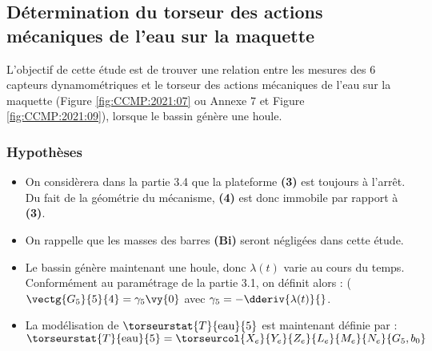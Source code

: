 \ifprof
\begin{corrige}
\end{corrige}
\else
\fi

\ifprof
\begin{corrige}
\end{corrige}
\else
\fi

\subsection{Détermination du torseur des actions mécaniques de l’eau sur la maquette}

\begin{obj}L’objectif de cette étude est de trouver une relation entre les mesures des 6 capteurs dynamométriques et le torseur des actions mécaniques de l’eau sur la maquette (Figure \ref{fig:CCMP:2021:07} ou Annexe 7 et Figure \ref{fig:CCMP:2021:09}), lorsque le bassin génère une houle.
\end{obj}


\subsubsection*{Hypothèses}
\begin{itemize}
    \item On considèrera dans la partie 3.4 que la plateforme \textbf{(3)} est toujours à l’arrêt. Du fait de la géométrie du mécanisme, \textbf{(4)} est donc immobile par rapport à \textbf{(3)}.
    \item On rappelle que les masses des barres \textbf{(Bi)} seront négligées dans cette étude.
    \item Le bassin génère maintenant une houle, donc $\lambda(t)$ varie au cours du temps. Conformément au paramétrage de la partie 3.1, on définit alors : ($\vectg{G_5}{5}{4}=\gamma_5 \vy{0}$ avec $\gamma_5=- \dderiv{\lambda(t)}{}$.
    \item La modélisation de $\torseurstat{T}{\text{eau}}{5}$ est maintenant définie par :
    $\torseurstat{T}{\text{eau}}{5} =  \torseurcol{X_e}{Y_e}{Z_e}{L_e}{M_e}{N_e}{G_5,b_0}$ 
\end{itemize}



